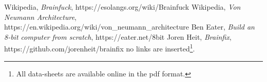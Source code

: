 \begin{thebibliography}{99} \label{resources}
 Wikipedia, \emph{Brainfuck}, https://esolangs.org/wiki/Brainfuck
 Wikipedia, \emph{Von Neumann Architecture},\\https://en.wikipedia.org/wiki/von\_neumann\_architecture
 Ben Eater, \emph{Build an 8-bit computer from scratch}, https://eater.net/8bit
 Joren Heit, \emph{Brainfix}, https://github.com/jorenheit/brainfix
 no links are inserted\footnote{All data-sheets are available online in the pdf format.}.
\end{thebibliography}

